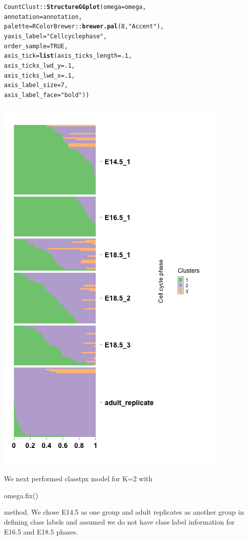 \documentclass[12pt]{article}\usepackage[]{graphicx}\usepackage[usenames,dvipsnames]{color}
\makeatletter
\newcommand{\hlnum}[1]{\textcolor[rgb]{0.686,0.059,0.569}{#1}}%
\newcommand{\hlstr}[1]{\textcolor[rgb]{0.192,0.494,0.8}{#1}}%
\newcommand{\hlopt}[1]{\textcolor[rgb]{0,0,0}{#1}}%
\newcommand{\hlstd}[1]{\textcolor[rgb]{0.345,0.345,0.345}{#1}}%
\newcommand{\hlkwc}[1]{\textcolor[rgb]{0.333,0.667,0.333}{#1}}%
\newcommand{\hlkwd}[1]{\textcolor[rgb]{0.737,0.353,0.396}{\textbf{#1}}}%
\newenvironment{kframe}{%
 \def\at@end@of@kframe{}%
 \ifinner\ifhmode%
  \def\at@end@of@kframe{\end{minipage}}%
  \begin{minipage}{\columnwidth}%
 \fi\fi%
 \def\FrameCommand##1{\hskip\@totalleftmargin \hskip-\fboxsep
 \colorbox{shadecolor}{##1}\hskip-\fboxsep
     \hskip-\linewidth \hskip-\@totalleftmargin \hskip\columnwidth}%
 \MakeFramed {\advance\hsize-\width
   \@totalleftmargin\z@ \linewidth\hsize
   \@setminipage}}%
 {\par\unskip\endMakeFramed%
 \at@end@of@kframe}
\newenvironment{knitrout}{}{} %
\makeatother
\begin{document}
\begin{knitrout}
\begin{kframe}
\begin{alltt}
\hlstd{CountClust}\hlopt{::}\hlkwd{StructureGGplot}\hlstd{(}\hlkwc{omega} \hlstd{= omega,}
                \hlkwc{annotation} \hlstd{= annotation,}
                \hlkwc{palette} \hlstd{= RColorBrewer}\hlopt{::}\hlkwd{brewer.pal}\hlstd{(}\hlnum{8}\hlstd{,} \hlstr{"Accent"}\hlstd{),}
                \hlkwc{yaxis_label} \hlstd{=} \hlstr{"Cell cycle phase"}\hlstd{,}
                \hlkwc{order_sample} \hlstd{=} \hlnum{TRUE}\hlstd{,}
                \hlkwc{axis_tick} \hlstd{=} \hlkwd{list}\hlstd{(}\hlkwc{axis_ticks_length} \hlstd{=} \hlnum{.1}\hlstd{,}
                                 \hlkwc{axis_ticks_lwd_y} \hlstd{=} \hlnum{.1}\hlstd{,}
                                 \hlkwc{axis_ticks_lwd_x} \hlstd{=} \hlnum{.1}\hlstd{,}
                                 \hlkwc{axis_label_size} \hlstd{=} \hlnum{7}\hlstd{,}
                                 \hlkwc{axis_label_face} \hlstd{=} \hlstr{"bold"}\hlstd{))}
\end{alltt}
\end{kframe}
\includegraphics[width=3 in,height=5 in]{figure/structure_treutlin_maptpx-1} 

\end{knitrout}

We next performed classtpx model for K=2  with \begin{verb} omega.fix() \end{verb} method.
We chose E14.5 as one group and adult replicates as another group in defining class labels and
assumed we do not have class label information for E16.5 and E18.5 phases.
\end{document}
